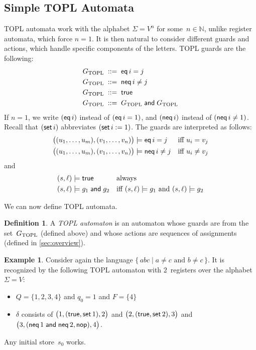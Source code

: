 \documentclass[9pt, preprint]{sigplanconf} %
\newcommand{\N}{\ensuremath{\mathbb{N}}}
\theoremstyle{definition}
\newtheorem{definition}{Definition}
\newtheorem{example}{Example}
\theoremstyle{remark}
\begin{document}
\subsection{Simple TOPL Automata} %

TOPL automata work with the alphabet $\Sigma=V^n$ for some~$n\in\N$, unlike register automata, which force $n=1$.
It is then natural to consider different guards and actions, which handle specific components of the letters.
TOPL guards are the following:
\begin{align*}
G_{\rm TOPL} &\;::=\; {\sf eq}\,i=j \\
G_{\rm TOPL} &\;::=\; {\sf neq}\,i\ne j \\
G_{\rm TOPL} &\;::=\; {\sf true} \\
G_{\rm TOPL} &\;::=\; G_{\rm TOPL} \mathrel{\sf and} G_{\rm TOPL}
\end{align*}
If $n=1$, we write $({\sf eq}\,i)$ instead of $({\sf eq}\,i=1)$, and $({\sf neq}\,i)$ instead of $({\sf neq}\,i\ne1)$.
Recall that $({\sf set}\,i)$ abbreviates $({\sf set}\,i:=1)$.
The guards are interpreted as follows:
\begin{align*}
\bigl((u_1,\ldots,u_m),(v_1,\ldots,v_n)\bigr) &\models {\sf eq}\,i=j
  &&\text{iff $u_i=v_j$} \\
\bigl((u_1,\ldots,u_m),(v_1,\ldots,v_n)\bigr) &\models {\sf neq}\,i\ne j
  &&\text{iff $u_i\ne v_j$}
\end{align*}
and
\begin{align*}
(s,\ell) &\models {\sf true}
  &&\text{always} \\
(s,\ell) &\models g_1\mathrel{\sf and} g_2
  &&\text{iff $(s,\ell)\models g_1$ and $(s,\ell)\models g_2$}
\end{align*}

We can now define TOPL automata.

\begin{definition}
A \emph{TOPL automaton} is an automaton whose guards are from the set~$G_{\rm TOPL}$ (defined above) and whose actions are sequences of assignments (defined in \autoref{sec:overview}).
\end{definition}

\begin{example}\label{ex:topl1}
Consider again the language $\{\,abc\mid\text{$a\ne c$ and $b\ne c$}\,\}$.
It is recognized by the following TOPL automaton with $2$~registers over the alphabet $\Sigma=V$:
\begin{itemize}
\item $Q=\{1,2,3,4\}$ and $q_0=1$ and $F=\{4\}$
\item $\delta$ consists of
  $\bigl(1,({\sf true}, {\sf set}\,1),2\bigr)$
  and $\bigl(2,({\sf true}, {\sf set}\,2),3\bigr)$
  and $\bigl(3,({\sf neq}\,1\mathrel{\sf and}{\sf neq}\,2, {\sf nop}),4\bigr)$.
\end{itemize}
Any initial store~$s_0$ works.
\end{example}
\end{document}
